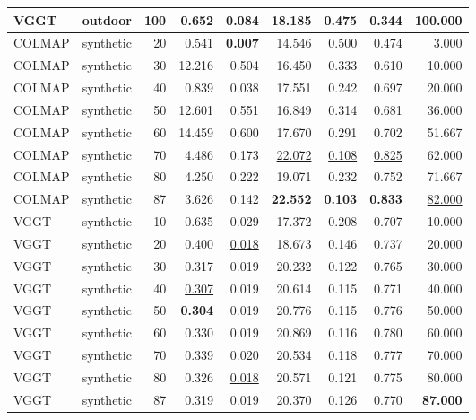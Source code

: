 \begin{table}[H]
\begin{tabular}{llrrrrrrr}
VGGT & outdoor & 100 & 0.652 & 0.084 & 18.185 & 0.475 & 0.344 & \textbf{100.000} \\
\midrule
COLMAP & synthetic & 20 & 0.541 & \textbf{0.007} & 14.546 & 0.500 & 0.474 & 3.000 \\
COLMAP & synthetic & 30 & 12.216 & 0.504 & 16.450 & 0.333 & 0.610 & 10.000 \\
COLMAP & synthetic & 40 & 0.839 & 0.038 & 17.551 & 0.242 & 0.697 & 20.000 \\
COLMAP & synthetic & 50 & 12.601 & 0.551 & 16.849 & 0.314 & 0.681 & 36.000 \\
COLMAP & synthetic & 60 & 14.459 & 0.600 & 17.670 & 0.291 & 0.702 & 51.667 \\
COLMAP & synthetic & 70 & 4.486 & 0.173 & \underline{22.072} & \underline{0.108} & \underline{0.825} & 62.000 \\
COLMAP & synthetic & 80 & 4.250 & 0.222 & 19.071 & 0.232 & 0.752 & 71.667 \\
COLMAP & synthetic & 87 & 3.626 & 0.142 & \textbf{22.552} & \textbf{0.103} & \textbf{0.833} & \underline{82.000} \\
VGGT & synthetic & 10 & 0.635 & 0.029 & 17.372 & 0.208 & 0.707 & 10.000 \\
VGGT & synthetic & 20 & 0.400 & \underline{0.018} & 18.673 & 0.146 & 0.737 & 20.000 \\
VGGT & synthetic & 30 & 0.317 & 0.019 & 20.232 & 0.122 & 0.765 & 30.000 \\
VGGT & synthetic & 40 & \underline{0.307} & 0.019 & 20.614 & 0.115 & 0.771 & 40.000 \\
VGGT & synthetic & 50 & \textbf{0.304} & 0.019 & 20.776 & 0.115 & 0.776 & 50.000 \\
VGGT & synthetic & 60 & 0.330 & 0.019 & 20.869 & 0.116 & 0.780 & 60.000 \\
VGGT & synthetic & 70 & 0.339 & 0.020 & 20.534 & 0.118 & 0.777 & 70.000 \\
VGGT & synthetic & 80 & 0.326 & \underline{0.018} & 20.571 & 0.121 & 0.775 & 80.000 \\
VGGT & synthetic & 87 & 0.319 & 0.019 & 20.370 & 0.126 & 0.770 & \textbf{87.000} \\
\bottomrule
\end{tabular}
\end{table}